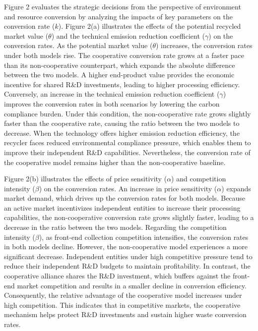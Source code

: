 \documentclass[authoryear,preprint,review,times,10pt]{elsarticle}
\begin{document}
Figure 2 evaluates the strategic decisions from the perspective of environment and resource conversion by analyzing the impacts of key parameters on the conversion rate ($k$). Figure 2(a) illustrates the effects of the potential recycled market value ($\theta$) and the technical emission reduction coefficient ($\gamma$) on the conversion rates. As the potential market value ($\theta$) increases, the conversion rates under both models rise. The cooperative conversion rate grows at a faster pace than its non-cooperative counterpart, which expands the absolute difference between the two models. A higher end-product value provides the economic incentive for shared R\&D investments, leading to higher processing efficiency. Conversely, an increase in the technical emission reduction coefficient ($\gamma$) improves the conversion rates in both scenarios by lowering the carbon compliance burden. Under this condition, the non-cooperative rate grows slightly faster than the cooperative rate, causing the ratio between the two models to decrease. When the technology offers higher emission reduction efficiency, the recycler faces reduced environmental compliance pressure, which enables them to improve their independent R\&D capabilities. Nevertheless, the conversion rate of the cooperative model remains higher than the non-cooperative baseline.

Figure 2(b) illustrates the effects of price sensitivity ($\alpha$) and competition intensity ($\beta$) on the conversion rates. An increase in price sensitivity ($\alpha$) expands market demand, which drives up the conversion rates for both models. Because an active market incentivizes independent entities to increase their processing capabilities, the non-cooperative conversion rate grows slightly faster, leading to a decrease in the ratio between the two models. Regarding the competition intensity ($\beta$), as front-end collection competition intensifies, the conversion rates in both models decline. However, the non-cooperative model experiences a more significant decrease. Independent entities under high competitive pressure tend to reduce their independent R\&D budgets to maintain profitability. In contrast, the cooperative alliance shares the R\&D investment, which buffers against the front-end market competition and results in a smaller decline in conversion efficiency. Consequently, the relative advantage of the cooperative model increases under high competition. This indicates that in competitive markets, the cooperative mechanism helps protect R\&D investments and sustain higher waste conversion rates.
\end{document}
